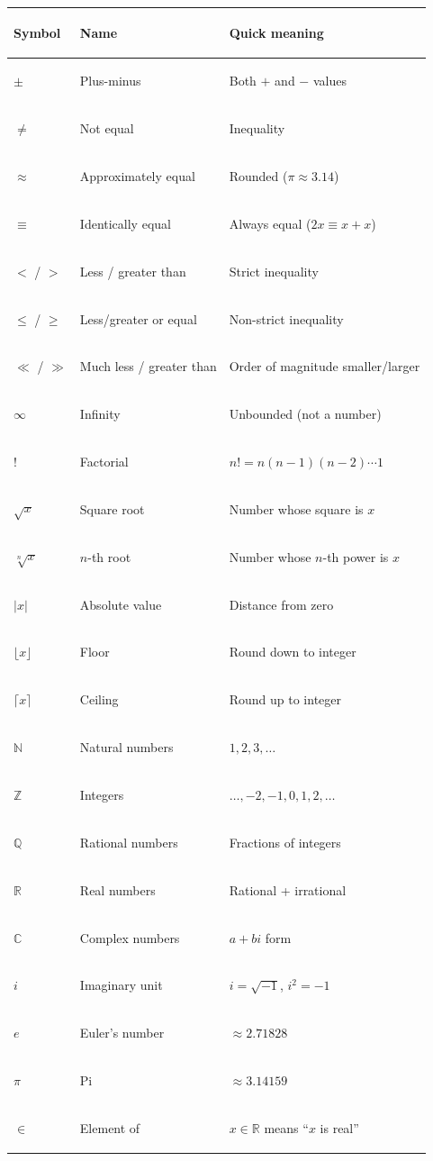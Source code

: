 \documentclass[11pt, letterpaper]{article}
\begin{document}
\noindent
{\small\renewcommand{\arraystretch}{1.5}
\begin{tabularx}{\textwidth}{>{\centering\arraybackslash}p{1.3cm}
                              >{\bfseries\raggedright\arraybackslash}p{4.5cm}
                              >{\raggedright\arraybackslash}X}
\toprule
\rowcolor{tableheaderpurple}
\textbf{Symbol} & \textbf{Name} & \textbf{Quick meaning} \\
\midrule
\rowcolor{rowPu}  $\pm$ & Plus-minus & Both $+$ and $-$ values \\
\rowcolor{rowA}  $\neq$ & Not equal & Inequality \\
\rowcolor{rowPu} $\approx$ & Approximately equal & Rounded ($\pi \approx 3.14$) \\
\rowcolor{rowA}  $\equiv$ & Identically equal & Always equal ($2x \equiv x + x$) \\
\rowcolor{rowPu} $<$ / $>$ & Less / greater than & Strict inequality \\
\rowcolor{rowA}  $\leq$ / $\geq$ & Less/greater or equal & Non-strict inequality \\
\rowcolor{rowPu} $\ll$ / $\gg$ & Much less / greater than & Order of magnitude smaller/larger \\
\rowcolor{rowA}  $\infty$ & Infinity & Unbounded (not a number) \\
\rowcolor{rowPu} $!$ & Factorial & $n! = n(n-1)(n-2)\cdots 1$ \\
\rowcolor{rowA}  $\sqrt{x}$ & Square root & Number whose square is $x$ \\
\rowcolor{rowPu} $\sqrt[n]{x}$ & $n$-th root & Number whose $n$-th power is $x$ \\
\rowcolor{rowA}  $|x|$ & Absolute value & Distance from zero \\
\rowcolor{rowPu} $\lfloor x \rfloor$ & Floor & Round down to integer \\
\rowcolor{rowA}  $\lceil x \rceil$ & Ceiling & Round up to integer \\
\rowcolor{rowPu} $\mathbb{N}$ & Natural numbers & $1, 2, 3, \ldots$ \\
\rowcolor{rowA}  $\mathbb{Z}$ & Integers & $\ldots, -2, -1, 0, 1, 2, \ldots$ \\
\rowcolor{rowPu} $\mathbb{Q}$ & Rational numbers & Fractions of integers \\
\rowcolor{rowA}  $\mathbb{R}$ & Real numbers & Rational + irrational \\
\rowcolor{rowPu} $\mathbb{C}$ & Complex numbers & $a + bi$ form \\
\rowcolor{rowA}  $i$ & Imaginary unit & $i = \sqrt{-1}$, $i^2 = -1$ \\
\rowcolor{rowPu} $e$ & Euler's number & $\approx 2.71828$ \\
\rowcolor{rowA}  $\pi$ & Pi & $\approx 3.14159$ \\
\rowcolor{rowPu} $\in$ & Element of & $x \in \mathbb{R}$ means ``$x$ is real'' \\
\bottomrule
\end{tabularx}}
\end{document}

